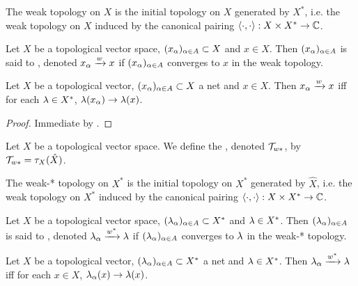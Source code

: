 \documentclass{book}
\begin{document}
	\begin{note}
		The weak topology on $X$ is the  initial topology on $X$ generated by $X^*$, i.e. the weak topology on $X$ induced by the canonical pairing $\langle \cdot, \cdot \rangle: X \times X^* \rightarrow \mathbb{C}$.
	\end{note}

	\begin{defn}
		Let $X$ be a topological vector space, $(x_{\alpha})_{\alpha \in A} \subset X$ and $x \in X$. Then $(x_{\alpha})_{\alpha \in A}$ is said to , denoted $x_{\alpha} \xrightarrow{w} x$ if $(x_{\alpha})_{\alpha \in A}$ converges to $x$ in the weak topology.
	\end{defn}
	
	\begin{ex} \lex{}
		Let $X$ be a topological vector, $(x_{\alpha})_{\alpha \in A} \subset X$ a net and $x \in X$. Then $x_{\alpha} \xrightarrow{w} x$ iff for each $\lambda \in X^*$, $ \lambda (x_{\alpha}) \rightarrow \lambda(x)$. 
	\end{ex}
	
	\begin{proof}
		Immediate by \rex{33011}.
	\end{proof}
	
	\begin{defn}
		Let $X$ be a topological vector space. We define the , denoted $\mathcal{T}_{w*}$, by $\mathcal{T}_{w*} = \tau_X(\hat{X})$. 
	\end{defn}
	
	\begin{note}
		The weak-* topology on $X^*$ is the initial topology on $X^*$ generated by $\hat{X}$, i.e. the weak topology on $X^*$ induced by the canonical pairing $\langle \cdot, \cdot \rangle: X \times X^* \rightarrow \mathbb{C}$.
	\end{note}
	
	\begin{defn}
		Let $X$ be a topological vector space, $(\lambda_{\alpha})_{\alpha \in A} \subset X^*$ and $\lambda \in X^*$. Then $(\lambda_{\alpha})_{\alpha \in A}$ is said to , denoted $\lambda_{\alpha} \xrightarrow{w^*} \lambda$ if $(\lambda_{\alpha})_{\alpha \in A}$ converges to $\lambda$ in the weak-* topology.
	\end{defn}
	
	\begin{ex} \lex{}
		Let $X$ be a topological vector, $(\lambda_{\alpha})_{\alpha \in A} \subset X^*$ a net and $\lambda \in X^*$. Then $\lambda_{\alpha} \xrightarrow{w^*} \lambda$ iff for each $x \in X$, $ \lambda_{\alpha} (x) \rightarrow \lambda(x)$. 
	\end{ex}
	
\end{document}
